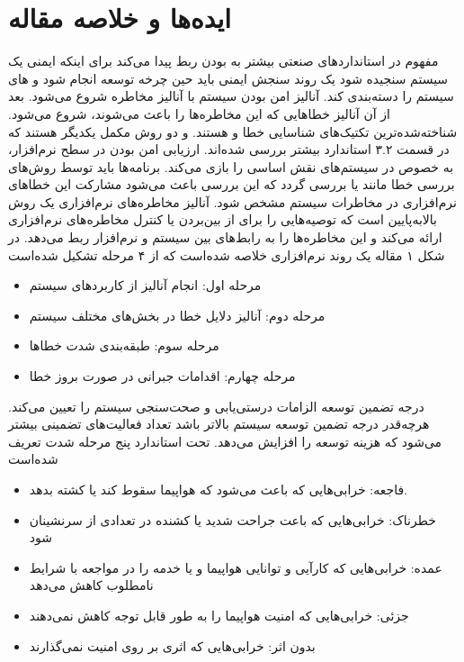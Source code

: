 \documentclass[a4paper, 12pt]{article}
\begin{document}
\section{ایده‌ها و خلاصه مقاله}
مفهوم
در استاندارد‌های صنعتی بیشتر به
بودن ربط پیدا می‌کند
برای اینکه ایمنی یک سیستم
سنجیده شود یک روند سنجش ایمنی باید حین چرخه توسعه انجام شود و
های سیستم را دسته‌بندی کند.
آنالیز امن بودن سیستم با آنالیز مخاطره شروع می‌شود. بعد از آن آنالیز خطا‌هایی که این مخاطره‌ها
را باعث می‌شوند، شروع می‌شود.
شناخته‌شده‌ترین تکتیک‌های شناسایی خطا 
و
هستند.
و
دو روش مکمل یکدیگر هستند که در قسمت ۳.۲ استاندارد
بیشتر بررسی شده‌اند.
ارزیابی امن بودن در سطح نرم‌افزار، به خصوص در سیستم‌های
نقش اساسی را بازی می‌کند.
برنامه‌ها باید توسط روش‌های بررسی خطا مانند
یا
بررسی گردد که این بررسی باعث می‌شود مشارکت این خطا‌های نرم‌افزاری در مخاطرات سیستم مشخص
شود.
آنالیز مخاطره‌های نرم‌افزاری یک روش بالا‌به‌پایین است که توصیه‌هایی را برای از بین‌بردن یا کنترل مخاطره‌های
نرم‌افزاری ارائه می‌کند و این مخاطره‌ها را به رابط‌های بین سیستم و نرم‌افزار ربط می‌دهد.
در شکل ۱ مقاله یک روند
نرم‌افزاری خلاصه شده‌است که از ۴ مرحله تشکیل شده‌است
\begin{itemize}
    \item مرحله اول: انجام آنالیز از کاربرد‌های سیستم
    \item مرحله دوم: آنالیز دلایل خطا در بخش‌های مختلف سیستم
    \item مرحله سوم: طبقه‌بندی شدت خطا‌ها
    \item مرحله چهارم: اقدامات جبرانی در صورت بروز خطا
\end{itemize}
درجه تضمین توسعه الزامات درستی‌یابی و صحت‌سنجی سیستم را تعیین می‌کند.
هر‌چه‌قدر درجه تضمین توسعه سیستم بالاتر باشد تعداد فعالیت‌های تضمینی بیشتر می‌شود که هزینه
توسعه را افزایش می‌دهد.
تحت استاندارد
پنج مرحله شدت تعریف شده‌است
\begin{itemize}
    \item فاجعه: خرابی‌هایی که باعث می‌شود که هواپیما سقوط کند یا کشته بدهد.
    \item خطرناک: خرابی‌هایی که باعت جراحت شدید یا کشنده در تعدادی از سرنشینان شود
    \item عمده: خرابی‌هایی که کارآیی و توانایی هواپیما و یا خدمه را در مواجعه با شرایط نامطلوب
    کاهش می‌دهد 
    \item جزئی: خرابی‌هایی که امنیت هواپیما را به طور قابل توجه کاهش نمی‌دهند
    \item بدون اثر: خرابی‌هایی که اثری بر روی امنیت نمی‌گذارند
\end{itemize}
\end{document}
